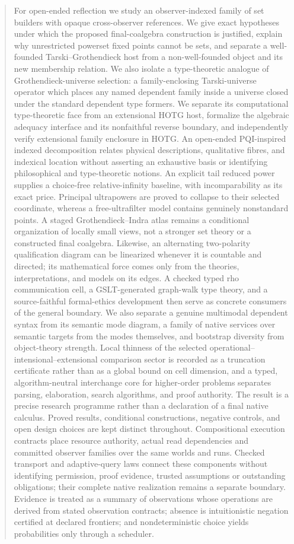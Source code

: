 \documentclass[11pt]{article}
\theoremstyle{definition}
\theoremstyle{remark}
\begin{document}
\begin{abstract}
For open-ended reflection we study an observer-indexed family of set builders
with opaque cross-observer references.  We give exact hypotheses under which
the proposed final-coalgebra construction is justified, explain why unrestricted
powerset fixed points cannot be sets, and separate a well-founded
Tarski--Grothendieck host from a non-well-founded object and its new membership
relation.  We also isolate a type-theoretic analogue of Grothendieck-universe
selection: a family-enclosing Tarski-universe operator which places any named
dependent family inside a universe closed under the standard dependent type
formers.  We separate its computational type-theoretic face from an extensional
HOTG host, formalize the algebraic adequacy interface and its nonfaithful reverse
boundary, and independently verify extensional family enclosure in HOTG.  An
open-ended PQI-inspired indexed decomposition relates physical descriptions,
qualitative fibres, and indexical location without asserting an exhaustive basis
or identifying philosophical and type-theoretic notions.  An explicit tail reduced
power supplies a choice-free relative-infinity baseline, with incomparability as
its exact price.  Principal ultrapowers are proved to collapse to their selected
coordinate, whereas a free-ultrafilter model contains genuinely nonstandard
points.  A staged Grothendieck--Indra atlas remains a conditional organization
of locally small views, not a stronger set theory or a constructed final
coalgebra.  Likewise, an alternating two-polarity qualification diagram can be
linearized whenever it is countable and directed; its mathematical force comes
only from the theories, interpretations, and models on its edges.  A checked
typed rho communication cell, a GSLT-generated graph-walk type theory, and a
source-faithful formal-ethics development then serve as concrete consumers of
the general boundary.  We also separate a genuine multimodal dependent syntax
from its semantic mode diagram, a family of native services over semantic
targets from the modes themselves, and bootstrap diversity from object-theory strength.
Local thinness of the selected operational--intensional--extensional
comparison sector is recorded as a truncation certificate rather than as a
global bound on cell dimension, and a typed, algorithm-neutral interchange
core for higher-order problems separates parsing, elaboration, search
algorithms, and proof authority.  The result is a
precise research programme rather than a declaration of a final native
calculus.  Proved results, conditional constructions, negative controls, and
open design choices are kept distinct throughout.
Compositional execution contracts place resource authority, actual read
dependencies and committed observer families over the same worlds and runs.
Checked transport and adaptive-query laws connect these components without
identifying permission, proof evidence, trusted assumptions or outstanding
obligations; their complete native realization remains a separate boundary.
Evidence is treated as a summary of observations whose operations are derived
from stated observation contracts; absence is intuitionistic negation
certified at declared frontiers; and nondeterministic choice yields
probabilities only through a scheduler.
\end{abstract}
\end{document}
